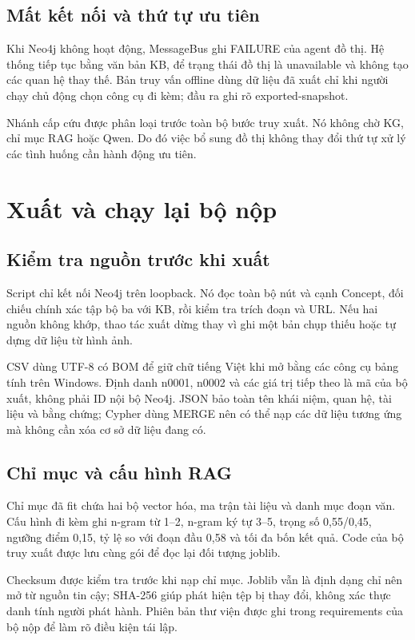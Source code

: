 \subsection{Mất kết nối và thứ tự ưu tiên}
Khi Neo4j không hoạt động, MessageBus ghi FAILURE của agent đồ thị. Hệ thống tiếp tục bằng văn bản KB, để trạng thái đồ thị là unavailable và không tạo các quan hệ thay thế. Bản truy vấn offline dùng dữ liệu đã xuất chỉ khi người chạy chủ động chọn công cụ đi kèm; đầu ra ghi rõ exported-snapshot.

Nhánh cấp cứu được phân loại trước toàn bộ bước truy xuất. Nó không chờ KG, chỉ mục RAG hoặc Qwen. Do đó việc bổ sung đồ thị không thay đổi thứ tự xử lý các tình huống cần hành động ưu tiên.

\section{Xuất và chạy lại bộ nộp}
\subsection{Kiểm tra nguồn trước khi xuất}
Script  chỉ kết nối Neo4j trên loopback. Nó đọc toàn bộ nút và cạnh Concept, đối chiếu chính xác tập bộ ba với KB, rồi kiểm tra trích đoạn và URL. Nếu hai nguồn không khớp, thao tác xuất dừng thay vì ghi một bản chụp thiếu hoặc tự dựng dữ liệu từ hình ảnh.

CSV dùng UTF-8 có BOM để giữ chữ tiếng Việt khi mở bằng các công cụ bảng tính trên Windows. Định danh n0001, n0002 và các giá trị tiếp theo là mã của bộ xuất, không phải ID nội bộ Neo4j. JSON bảo toàn tên khái niệm, quan hệ, tài liệu và bằng chứng; Cypher dùng MERGE nên có thể nạp các dữ liệu tương ứng mà không cần xóa cơ sở dữ liệu đang có.

\subsection{Chỉ mục và cấu hình RAG}
Chỉ mục đã fit chứa hai bộ vector hóa, ma trận tài liệu và danh mục đoạn văn. Cấu hình đi kèm ghi n-gram từ 1--2, n-gram ký tự 3--5, trọng số 0,55/0,45, ngưỡng điểm 0,15, tỷ lệ so với đoạn đầu 0,58 và tối đa bốn kết quả. Code của bộ truy xuất được lưu cùng gói để đọc lại đối tượng joblib.

Checksum được kiểm tra trước khi nạp chỉ mục. Joblib vẫn là định dạng chỉ nên mở từ nguồn tin cậy; SHA-256 giúp phát hiện tệp bị thay đổi, không xác thực danh tính người phát hành. Phiên bản thư viện được ghi trong requirements của bộ nộp để làm rõ điều kiện tái lập.

